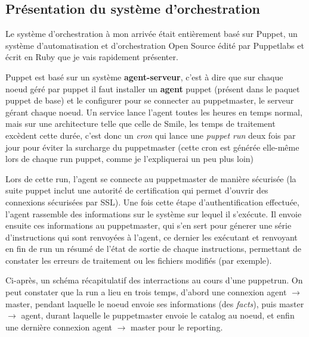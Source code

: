 \documentclass[14 pt]{extreport}
\begin{document}
\subsection{Présentation du système d'orchestration}

Le système d'orchestration à mon arrivée était entièrement basé sur Puppet, un système d'automatisation et d'orchestration Open Source édité par Puppetlabs et écrit en Ruby que je vais rapidement présenter.

Puppet est basé sur un système \textbf{agent-serveur}, c'est à dire que sur chaque noeud géré par puppet il faut installer un \textbf{agent} puppet (présent dans le paquet puppet de base) et le configurer pour se connecter au puppetmaster, le serveur gérant chaque noeud. Un service lance l'agent toutes les heures en temps normal, mais sur une architecture telle que celle de Smile, les temps de traitement excèdent cette durée, c'est donc un \emph{cron} qui lance une \emph{puppet run} deux fois par jour pour éviter la surcharge du puppetmaster (cette cron est générée elle-même lors de chaque run puppet, comme je l'expliquerai un peu plus loin)

Lors de cette run, l'agent se connecte au puppetmaster de manière sécurisée (la suite puppet inclut une autorité de certification qui permet d'ouvrir des connexions sécurisées par SSL). Une fois cette étape d'authentification effectuée, l'agent rassemble des informations sur le système sur lequel il s'exécute. Il envoie ensuite ces informations au puppetmaster, qui s'en sert pour génerer une série d'instructions qui sont renvoyées à l'agent, ce dernier les exécutant et renvoyant en fin de run un résumé de l'état de sortie de chaque instructions, permettant de constater les erreurs de traitement ou les fichiers modifiés (par exemple).

Ci-après, un schéma récapitulatif des interractions au cours d'une puppetrun. On peut constater que la run a lieu en trois temps, d'abord une connexion agent $\rightarrow$ master, pendant laquelle le noeud envoie ses informations (des \emph{facts}), puis master $\rightarrow$ agent, durant laquelle le puppetmaster envoie le catalog au noeud, et enfin une dernière connexion agent $\rightarrow$ master pour le reporting.
\end{document}
